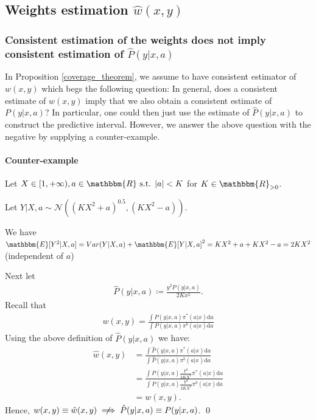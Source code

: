 \subsection{Weights estimation $\hat{w}(x, y)$}\label{sec:weights_estimation_app}
\subsubsection{Consistent estimation of the weights does not imply consistent estimation of $\hat{P}(y| x, a)$}
In Proposition \ref{coverage_theorem}, we assume to have consistent estimator of $w(x, y)$ which begs the following question: In general, does a consistent estimate of $w(x, y)$ imply that we also obtain a consistent estimate of $P(y|x, a)$? In particular, one could then just use the estimate of $\hat{P}(y|x, a)$ to construct the predictive interval. However, we answer the above question with the negative by supplying a counter-example. 


\paragraph{Counter-example}
Let $X \in [1, + \infty), a\in \mathbbm{R} \textup{ s.t. } |a| < K$ for $K \in \mathbbm{R}_{>0}$.

Let $Y|X, a \sim \mathcal{N}((KX^2+a)^{0.5}, (KX^2-a))$.

We have $\mathbbm{E}[Y^2|X, a] = Var(Y|X, a) + \mathbbm{E}[Y|X, a]^2 = KX^2 +a + KX^2 -a = 2KX^2$ (independent of $a$)

Next let 
\begin{align}
  \hat{P}(y|x, a) \coloneqq \frac{y^2P(y|x, a)}{2Kx^2}. \label{def:pyxhat} 
\end{align}
Recall that 
\begin{align}
    w(x, y) = \frac{\int P(y|x, a) \pi^*(a|x) \mathrm{d}a}{\int P(y| x, a) \pi^b(a|x) \mathrm{d}a}
\end{align}
Using the above definition of $\hat{P}(y|x, a)$ we have:
\begin{align}
    \hat{w}(x, y) &= \frac{\int \hat{P}(y|x, a) \pi^*(a|x) \mathrm{d}a}{\int \hat{P}(y| x, a) \pi^b(a|x) \mathrm{d}a} \nonumber\\ 
     &= \frac{\int P(y|x, a) \frac{Y^2}{2KX^2} \pi^*(a|x) \mathrm{d}a}{\int P(y| x, a) \frac{Y^2}{2KX^2} \pi^b(a|x) \mathrm{d}a} \nonumber\\ 
    &= w(x, y).\nonumber
\end{align}
Hence, $w(x, y) \equiv \hat{w}(x, y) \centernot\implies \hat{P}(y|x, a) \equiv P(y|x, a)$.
\qed 


